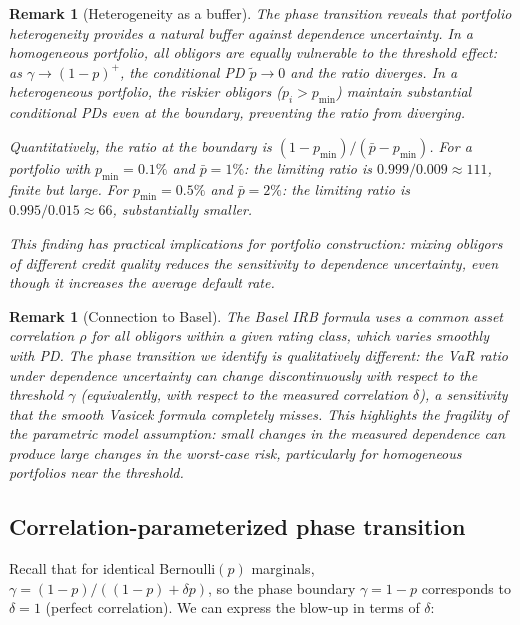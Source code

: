\documentclass[11pt]{article}
\newtheorem{remark}[theorem]{Remark}
\theoremstyle{definition}
\newcommand{\1}{\mathbf{1}}
\begin{document}
\begin{remark}[Heterogeneity as a buffer]\label{rem:buffer}
The phase transition reveals that portfolio heterogeneity provides a natural buffer against dependence uncertainty. In a homogeneous portfolio, all obligors are equally vulnerable to the threshold effect: as $\gamma \to (1-p)^+$, the conditional PD $\tilde{p} \to 0$ and the ratio diverges. In a heterogeneous portfolio, the riskier obligors ($p_i > p_{\min}$) maintain substantial conditional PDs even at the boundary, preventing the ratio from diverging.

Quantitatively, the ratio at the boundary is $(1-p_{\min})/(\bar{p} - p_{\min})$. For a portfolio with $p_{\min} = 0.1\%$ and $\bar{p} = 1\%$: the limiting ratio is $0.999/0.009 \approx 111$, finite but large. For $p_{\min} = 0.5\%$ and $\bar{p} = 2\%$: the limiting ratio is $0.995/0.015 \approx 66$, substantially smaller.

This finding has practical implications for portfolio construction: mixing obligors of different credit quality reduces the sensitivity to dependence uncertainty, even though it increases the average default rate.
\end{remark}

\begin{remark}[Connection to Basel]\label{rem:phase_basel}
The Basel IRB formula uses a common asset correlation $\rho$ for all obligors within a given rating class, which varies smoothly with PD. The phase transition we identify is qualitatively different: the VaR ratio under dependence uncertainty can change \emph{discontinuously} with respect to the threshold $\gamma$ (equivalently, with respect to the measured correlation $\delta$), a sensitivity that the smooth Vasicek formula completely misses. This highlights the fragility of the parametric model assumption: small changes in the measured dependence can produce large changes in the worst-case risk, particularly for homogeneous portfolios near the threshold.
\end{remark}

\subsection{Correlation-parameterized phase transition}

Recall that for identical Bernoulli$(p)$ marginals, $\gamma = (1-p)/((1-p) + \delta p)$, so the phase boundary $\gamma = 1-p$ corresponds to $\delta = 1$ (perfect correlation). We can express the blow-up in terms of $\delta$:
\end{document}
